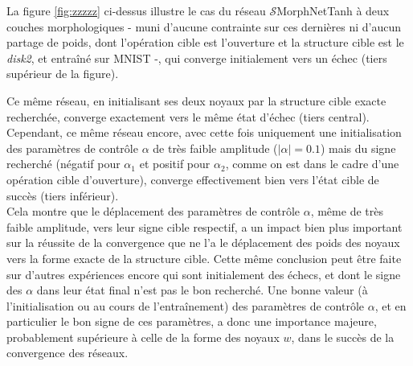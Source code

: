 \vspace{-2.0mm}
La figure \ref{fig:zzzzz} ci-dessus illustre le cas du réseau $\mathcal{S}$MorphNetTanh à deux couches morphologiques - muni d'aucune contrainte sur ces dernières ni d'aucun partage de poids, dont l'opération cible est l'ouverture et la structure cible est le \textit{disk2}, et entraîné sur MNIST -, qui converge initialement vers un échec (tiers supérieur de la figure).

\newpage

\noindent Ce même réseau, en initialisant ses deux noyaux par la structure cible exacte recherchée, converge exactement vers le même état d'échec (tiers central). Cependant, ce même réseau encore, avec cette fois uniquement une initialisation des paramètres de contrôle $\alpha$ de très faible amplitude ($|\alpha| = 0.1$) mais du signe recherché (négatif pour $\alpha_1$ et positif pour $\alpha_2$, comme on est dans le cadre d'une opération cible d'ouverture), converge effectivement bien vers l'état cible de succès (tiers inférieur). \\

\vspace{-1.6mm}
Cela montre que le déplacement des paramètres de contrôle $\alpha$, même de très faible amplitude, vers leur signe cible respectif, a un impact bien plus important sur la réussite de la convergence que ne l'a le déplacement des poids des noyaux vers la forme exacte de la structure cible. Cette même conclusion peut être faite sur d'autres expériences encore qui sont initialement des échecs, et dont le signe des $\alpha$ dans leur état final n'est pas le bon recherché. Une bonne valeur (à l'initialisation ou au cours de l'entraînement) des paramètres de contrôle $\alpha$, et en particulier le bon signe de ces paramètres, a donc une importance majeure, probablement supérieure à celle de la forme des noyaux $w$, dans le succès de la convergence des réseaux.

\vspace{1.0mm}


